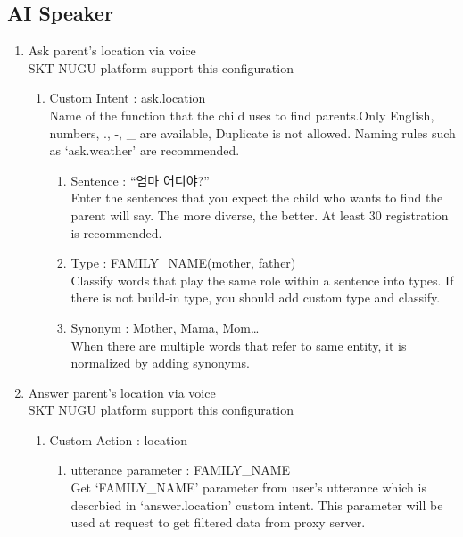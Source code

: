 \documentclass[conference]{IEEEtran}
\begin{document}
\subsection{AI Speaker}
\begin{enumerate}
    \item Ask parent’s location via voice\\
    SKT NUGU platform support this configuration
    \begin{enumerate}
        \item Custom Intent : ask.location\\
        Name of the function that the child uses to find parents.Only English, numbers, ., -, \_ are available, Duplicate is not allowed. Naming rules such as ‘ask.weather’ are recommended. 
        \begin{enumerate}
            \item Sentence : “엄마 어디야?”\\
            Enter the sentences that you expect the child who wants to find the parent will say. The more diverse, the better. At least 30 registration is recommended.\\
            \item Type : FAMILY\_NAME(mother, father)\\
            Classify words that play the same role within a sentence into types. If there is not build-in type, you should add custom type and classify.\\
            \item Synonym : Mother, Mama, Mom…\\
            When there are multiple words that refer to same entity, it is normalized by adding synonyms.\\
        \end{enumerate}
    \end{enumerate}
    \item Answer parent’s location via voice\\
    SKT NUGU platform support this configuration
    \begin{enumerate}
        \item Custom Action : location
        \begin{enumerate}
            \item utterance parameter : FAMILY\_NAME\\
            Get ‘FAMILY\_NAME’ parameter from user’s utterance which is descrbied in ‘answer.location’ custom intent. This parameter will be used at request to get filtered data from proxy server.\\

\end{enumerate}
\end{enumerate}
\end{enumerate}
\end{document}
